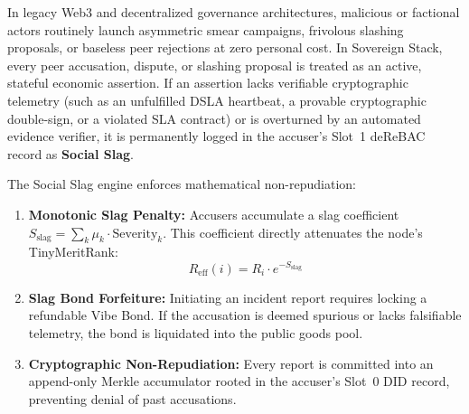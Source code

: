 \documentclass[a4paper,11pt,twoside,parskip=half-,headings=small]{scrartcl}
\begin{document}
In legacy Web3 and decentralized governance architectures, malicious or factional actors
routinely launch asymmetric smear campaigns, frivolous slashing proposals, or baseless peer
rejections at zero personal cost. In Sovereign Stack, every peer accusation, dispute, or
slashing proposal is treated as an active, stateful economic assertion. If an assertion lacks
verifiable cryptographic telemetry (such as an unfulfilled DSLA heartbeat, a provable
cryptographic double-sign, or a violated SLA contract) or is overturned by an automated evidence
verifier, it is permanently logged in the accuser's Slot~1 deReBAC record as \textbf{Social Slag}.

The Social Slag engine enforces mathematical non-repudiation:
\begin{enumerate}
  \item \textbf{Monotonic Slag Penalty:} Accusers accumulate a slag coefficient
$S_{\text{slag}} = \sum_{k} \mu_k \cdot \text{Severity}_k$. This coefficient directly
attenuates the node's TinyMeritRank:
\begin{equation}
R_{\text{eff}}(i) = R_i \cdot e^{-S_{\text{slag}}}
\end{equation}
  \item \textbf{Slag Bond Forfeiture:} Initiating an incident report requires locking a
refundable Vibe Bond. If the accusation is deemed spurious or lacks falsifiable telemetry,
the bond is liquidated into the public goods pool.
  \item \textbf{Cryptographic Non-Repudiation:} Every report is committed into an append-only
Merkle accumulator rooted in the accuser's Slot~0 DID record, preventing denial of past accusations.
\end{enumerate}
\end{document}
